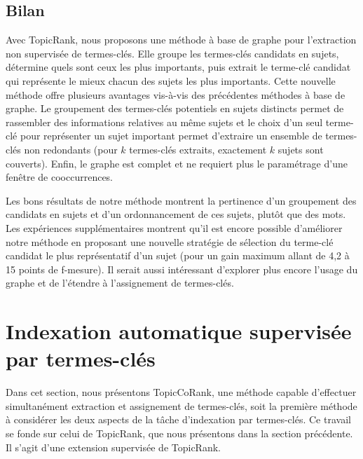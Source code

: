       \subsection{Bilan}
      \label{subsec:main-automatic_keyphrase_annotation-unsupervised_automatic_keyphrase_extraction-bilan}
        Avec TopicRank, nous proposons une méthode à base de graphe pour
        l'extraction non supervisée de termes-clés. Elle groupe les termes-clés
        candidats en sujets, détermine quels sont ceux les plus importants, puis
        extrait le terme-clé candidat qui représente le mieux chacun des sujets
        les plus importants. Cette nouvelle méthode offre plusieurs avantages
        vis-à-vis des précédentes méthodes à base de graphe. Le groupement des
        termes-clés potentiels en sujets distincts permet de rassembler des
        informations relatives au même sujets et le choix d'un seul terme-clé
        pour représenter un sujet important permet d'extraire un ensemble de
        termes-clés non redondants (pour $k$ termes-clés extraits, exactement
        $k$ sujets sont couverts). Enfin, le graphe est complet et ne requiert
        plus le paramétrage d'une fenêtre de cooccurrences.

        Les bons résultats de notre méthode montrent la pertinence d'un
        groupement des candidats en sujets et d'un ordonnancement de ces sujets,
        plutôt que des mots. Les expériences supplémentaires montrent qu'il est
        encore possible d'améliorer notre méthode en proposant une nouvelle
        stratégie de sélection du terme-clé candidat le plus représentatif d'un
        sujet (pour un gain maximum allant de 4,2 à 15 points de f-mesure). Il
        serait aussi intéressant d'explorer plus encore l'usage du graphe et de
        l'étendre à l'assignement de termes-clés.


  \section{Indexation automatique supervisée par termes-clés}
  \label{sec:main-automatic_keyphrase_annotation-supervised_automatic_keyphrase_extraction}
    Dans cet section, nous présentons TopicCoRank, une méthode capable
    d'effectuer simultanément extraction et assignement de termes-clés, soit la
    première méthode à considérer les deux aspects de la tâche d'indexation par
    termes-clés. Ce travail se fonde sur celui de TopicRank, que nous présentons
    dans la section précédente. Il s'agit d'une extension supervisée de
    TopicRank.

